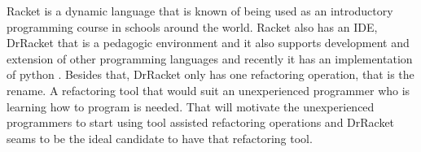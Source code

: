 Racket is a dynamic language that is known of being used as an introductory programming course in schools around the world. 
Racket also has an IDE, DrRacket that is a pedagogic environment \cite{drscheme_pegadogy} and it also supports development and extension of other programming languages \cite{tobin2011languages} and recently it has an implementation of python \cite{ramos2014implementation}.
Besides that, DrRacket only has one refactoring operation, that is the rename.
A refactoring tool that would suit an unexperienced programmer who is learning how to program is needed. 
That will motivate the unexperienced programmers to start using tool assisted refactoring operations and DrRacket seams to be the ideal candidate to have that refactoring tool.